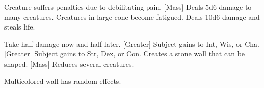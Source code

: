 \begin{swspelllist}
     Creature suffers penalties due to debilitating pain.
    [Mass] Deals 5d6 damage to many creatures.
     Creatures in large cone become fatigued.
     Deals 10d6 damage and steals life.

     Take half damage now and half later. 
    [Greater] Subject gains  to Int, Wis, or Cha.
    [Greater] Subject gains  to Str, Dex, or Con.
     Creates a stone wall that can be shaped.
    [Mass] Reduces several creatures.

     Multicolored wall has random effects.
\end{swspelllist}

